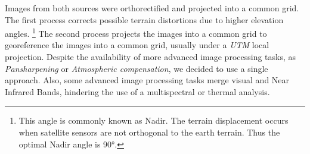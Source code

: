 Images from both sources were orthorectified and projected into a common grid. The first process corrects
possible terrain distortions due to higher elevation angles. \footnote{This angle is commonly known as Nadir.
The terrain displacement occurs when satellite sensors are not orthogonal to the earth terrain. Thus the optimal
Nadir angle is \ang{90}.} The second process projects the images into a common grid to georeference the images into 
a common grid, usually under a \textit{UTM} local projection. Despite the availability of more advanced image 
processing tasks, as \textit{Pansharpening} or \textit{Atmospheric compensation}, we decided to use a single approach. 
Also, some advanced image processing tasks merge visual and Near Infrared Bands, hindering the use of a multispectral 
or thermal analysis. 


